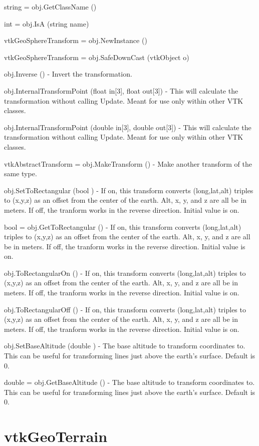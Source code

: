 \begin{DoxyItemize}
\item {\ttfamily string = obj.\-Get\-Class\-Name ()}  
\item {\ttfamily int = obj.\-Is\-A (string name)}  
\item {\ttfamily vtk\-Geo\-Sphere\-Transform = obj.\-New\-Instance ()}  
\item {\ttfamily vtk\-Geo\-Sphere\-Transform = obj.\-Safe\-Down\-Cast (vtk\-Object o)}  
\item {\ttfamily obj.\-Inverse ()} -\/ Invert the transformation.  
\item {\ttfamily obj.\-Internal\-Transform\-Point (float in\mbox{[}3\mbox{]}, float out\mbox{[}3\mbox{]})} -\/ This will calculate the transformation without calling Update. Meant for use only within other V\-T\-K classes.  
\item {\ttfamily obj.\-Internal\-Transform\-Point (double in\mbox{[}3\mbox{]}, double out\mbox{[}3\mbox{]})} -\/ This will calculate the transformation without calling Update. Meant for use only within other V\-T\-K classes.  
\item {\ttfamily vtk\-Abstract\-Transform = obj.\-Make\-Transform ()} -\/ Make another transform of the same type.  
\item {\ttfamily obj.\-Set\-To\-Rectangular (bool )} -\/ If on, this transform converts (long,lat,alt) triples to (x,y,z) as an offset from the center of the earth. Alt, x, y, and z are all be in meters. If off, the tranform works in the reverse direction. Initial value is on.  
\item {\ttfamily bool = obj.\-Get\-To\-Rectangular ()} -\/ If on, this transform converts (long,lat,alt) triples to (x,y,z) as an offset from the center of the earth. Alt, x, y, and z are all be in meters. If off, the tranform works in the reverse direction. Initial value is on.  
\item {\ttfamily obj.\-To\-Rectangular\-On ()} -\/ If on, this transform converts (long,lat,alt) triples to (x,y,z) as an offset from the center of the earth. Alt, x, y, and z are all be in meters. If off, the tranform works in the reverse direction. Initial value is on.  
\item {\ttfamily obj.\-To\-Rectangular\-Off ()} -\/ If on, this transform converts (long,lat,alt) triples to (x,y,z) as an offset from the center of the earth. Alt, x, y, and z are all be in meters. If off, the tranform works in the reverse direction. Initial value is on.  
\item {\ttfamily obj.\-Set\-Base\-Altitude (double )} -\/ The base altitude to transform coordinates to. This can be useful for transforming lines just above the earth's surface. Default is 0.  
\item {\ttfamily double = obj.\-Get\-Base\-Altitude ()} -\/ The base altitude to transform coordinates to. This can be useful for transforming lines just above the earth's surface. Default is 0.  
\end{DoxyItemize}\hypertarget{vtkgeovis_vtkgeoterrain}{}\section{vtk\-Geo\-Terrain}\label{vtkgeovis_vtkgeoterrain}
